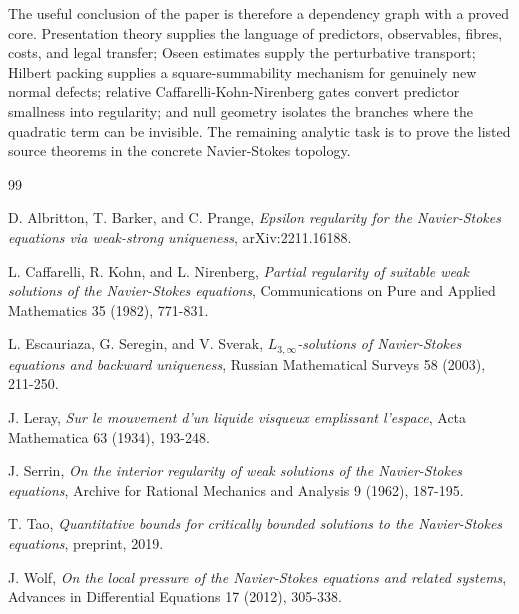 \documentclass[11pt]{article}
\begin{document}
The useful conclusion of the paper is therefore a dependency graph with a proved
core. Presentation theory supplies the language of predictors, observables,
fibres, costs, and legal transfer; Oseen estimates supply the perturbative
transport; Hilbert packing supplies a square-summability mechanism for genuinely
new normal defects; relative Caffarelli-Kohn-Nirenberg gates convert predictor
smallness into regularity; and null geometry isolates the branches where the
quadratic term can be invisible.  The remaining analytic task is to prove the
listed source theorems in the concrete Navier-Stokes topology.

\begin{thebibliography}{99}

D. Albritton, T. Barker, and C. Prange,
\emph{Epsilon regularity for the Navier-Stokes equations via weak-strong uniqueness},
arXiv:2211.16188.

L. Caffarelli, R. Kohn, and L. Nirenberg,
\emph{Partial regularity of suitable weak solutions of the Navier-Stokes equations},
Communications on Pure and Applied Mathematics 35 (1982), 771-831.

L. Escauriaza, G. Seregin, and V. Sverak,
\emph{\(L_{3,\infty}\)-solutions of Navier-Stokes equations and backward uniqueness},
Russian Mathematical Surveys 58 (2003), 211-250.

J. Leray,
\emph{Sur le mouvement d'un liquide visqueux emplissant l'espace},
Acta Mathematica 63 (1934), 193-248.

J. Serrin,
\emph{On the interior regularity of weak solutions of the Navier-Stokes equations},
Archive for Rational Mechanics and Analysis 9 (1962), 187-195.

T. Tao,
\emph{Quantitative bounds for critically bounded solutions to the Navier-Stokes equations},
preprint, 2019.

J. Wolf,
\emph{On the local pressure of the Navier-Stokes equations and related systems},
Advances in Differential Equations 17 (2012), 305-338.

\end{thebibliography}
\end{document}
